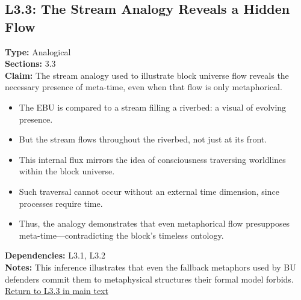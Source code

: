 \documentclass[12pt]{book}
\newcommand{\returnlink}[1]{\hyperref[logic:#1]{Return to #1 in main text}\xspace}
\begin{document}
\subsection*{L3.3: The Stream Analogy Reveals a Hidden Flow}\label{appendix:L3.3}
\textbf{Type:} Analogical \\
\textbf{Sections:} 3.3 \\
\textbf{Claim:} The stream analogy used to illustrate block universe flow reveals the necessary presence of meta-time, even when that flow is only metaphorical.
\begin{itemize}
  \item The EBU is compared to a stream filling a riverbed: a visual of evolving presence.
  \item But the stream flows throughout the riverbed, not just at its front.
  \item This internal flux mirrors the idea of consciousness traversing worldlines within the block universe.
  \item Such traversal cannot occur without an external time dimension, since processes require time.
  \item Thus, the analogy demonstrates that even metaphorical flow presupposes meta-time---contradicting the block's timeless ontology.
\end{itemize}
\textbf{Dependencies:} L3.1, L3.2 \\
\textbf{Notes:} This inference illustrates that even the fallback metaphors used by BU defenders commit them to metaphysical structures their formal model forbids.\\
\returnlink{L3.3}
\end{document}
